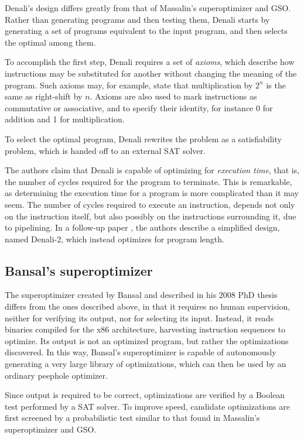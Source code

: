 \documentclass[a4paper,11pt]{kth-mag}
\begin{document}
Denali's design differs greatly from that of Massalin's superoptimizer and GSO.
Rather than generating programs and then testing them, Denali starts by generating a set of programs equivalent to the input program, and then selects the optimal among them.

To accomplish the first step, Denali requires a set of \emph{axioms}, which describe how instructions may be substituted for another without changing the meaning of the program.
Such axioms may, for example, state that multiplication by $2^n$ is the same as right-shift by $n$.
Axioms are also used to mark instructions as commutative or associative, and to specify their identity, for instance 0 for addition and 1 for multiplication.

To select the optimal program, Denali rewrites the problem as a satisfiability problem, which is handed off to an external SAT solver.

The authors claim that Denali is capable of optimizing for \emph{execution time}, that is, the number of cycles required for the program to terminate.
This is remarkable, as determining the execution time for a program is more complicated than it may seem.
The number of cycles required to execute an instruction, depends not only on the instruction itself, but also possibly on the instructions surrounding it, due to pipelining.
In a follow-up paper \cite{joshi06}, the authors describe a simplified design, named Denali-2, which instead optimizes for program length.


\subsection{Bansal's superoptimizer}

The superoptimizer created by Bansal and described in his 2008 PhD thesis \cite{bansal_thesis} differs from the ones described above, in that it requires no human supervision, neither for verifying its output, nor for selecting its input.
Instead, it reads binaries compiled for the x86 architecture, harvesting instruction sequences to optimize.
Its output is not an optimized program, but rather the optimizations discovered.
In this way, Bansal's superoptimizer is capable of autonomously generating a very large library of optimizations, which can then be used by an ordinary peephole optimizer.

Since output is required to be correct, optimizations are verified by a Boolean test performed by a SAT solver.
To improve speed, candidate optimizations are first screened by a probabilistic test similar to that found in Massalin's superoptimizer and GSO.
\end{document}
